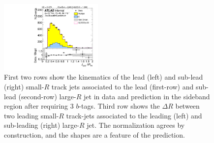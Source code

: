 \begin{figure}[htbp!]
\begin{center}
\includegraphics[angle=270, width=0.45\textwidth]{./figures/boosted/Sideband/b77_ThreeTag_Sideband_sublHCand_trk_dr.pdf}
  \caption{First two rows show the kinematics of the lead (left) and sub-lead (right) small-$R$ track jets associated to the lead (first-row) and sub-lead (second-row) large-$R$ jet in data and prediction in the sideband region after requiring 3 $b$-tags. Third row shows the $\Delta R$ between two leading small-$R$ track-jets associated to the leading (left) and sub-leading (right) large-$R$ jet. The normalization agrees by construction, and the shapes are a feature of the prediction. }
  \label{fig:boosted-3b-sideband-ak2}
\end{center}
\end{figure}


